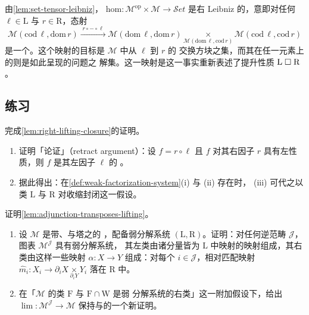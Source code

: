 \begin{remark}\label{rem:hom-right-leibniz}
由\cref{lem:set-tensor-leibniz}，
$\mathrm{hom}\colon\mathcal{M}^{\mathrm{op}}\times\mathcal{M}\to\mathcal{S}et$
是右 Leibniz 的，意即对任何 $\ell\in\mathrm{L}$ 与 $r\in\mathrm{R}$，态射
\[ \mathcal{M}(\mathrm{cod}\,\ell,\mathrm{dom}\,r)
   \xrightarrow{\;r\circ-\circ\ell\;}
   \mathcal{M}(\mathrm{dom}\,\ell,\mathrm{dom}\,r)
   \underset{\mathcal{M}(\mathrm{dom}\,\ell,\mathrm{cod}\,r)}{\times}
   \mathcal{M}(\mathrm{cod}\,\ell,\mathrm{cod}\,r) \]
是一个\trEpimorphism。这个映射的目标是 $\mathcal{M}$ 中从 $\ell$ 到 $r$ 的
交换方块之集，而其在任一元素上的\trFiber{}则是如此呈现的\trLifting{}问题之
解集。这一映射是\trEpimorphism{}这一事实重新表述了提升性质
$\mathrm{L}\mathrel{\square}\mathrm{R}$。
\end{remark}

\subsection*{练习}

\begin{exercise}\label{ex:finish-closure-proof}
完成\cref{lem:right-lifting-closure}的证明。
\end{exercise}

\begin{exercise}\label{ex:retract-argument}
\begin{enumerate}[label=(\roman*)]
\item 证明「\trRetract{}论证」（retract argument）：设 $f=r\circ\ell$ 且 $f$
  对其右因子 $r$ 具有左\trLifting{}性质，则 $f$ 是其左因子 $\ell$ 的%
  \trRetract。
\item 据此得出：在\cref{def:weak-factorization-system}(i) 与 (ii) 存在时，
  (iii) 可代之以类 $\mathrm{L}$ 与 $\mathrm{R}$ 对收缩封闭这一假设。
\end{enumerate}
\end{exercise}

\begin{exercise}\label{ex:prove-adjunction-transposes}
证明\cref{lem:adjunction-transposes-lifting}。
\end{exercise}

\begin{exercise}\label{ex:inverse-category-diagram-wfs}
\begin{enumerate}[label=(\roman*)]
\item 设 $\mathcal{M}$ 是带\trProduct、\trPullback{}与塔之\trLimit{}的%
  \trCategory，配备弱分解系统 $(\mathrm{L},\mathrm{R})$。证明：对任何逆范畴
  $\mathcal{J}$，图表\trCategory{} $\mathcal{M}^{\mathcal{J}}$ 具有弱分解系统，
  其左类由诸分量皆为 $\mathrm{L}$ 中映射的映射组成，其右类由这样一些映射
  $\alpha\colon X\to Y$ 组成：对每个 $i\in\mathcal{J}$，相对匹配映射
  $\widehat{m}_i\colon X_i\to\partial_iX\underset{\partial_iY}{\times}Y_i$ 落在 $\mathrm{R}$ 中。
\item 在「$\mathcal{M}$ 的类 $\mathrm{F}$ 与 $\mathrm{F}\cap\mathrm{W}$ 是弱
  分解系统的右类」这一附加假设下，给出 $\lim\colon\mathcal{M}^{\mathcal{J}}\to\mathcal{M}$ 保持\trFibration{}与\trTrivialFibration{}的一个新证明。
\end{enumerate}
\end{exercise}

